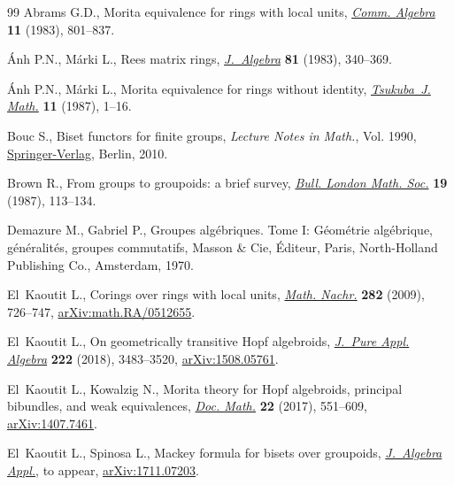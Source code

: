 \documentclass[11pt]{article}
\numberwithin{equation}{section}
\begin{document}
\begin{thebibliography}{99}
Abrams G.D., Morita equivalence for rings with local units, \href{https://doi.org/10.1080/00927878308822881}{\textit{Comm. Algebra}} \textbf{11} (1983), 801--837.

\'{A}nh P.N., M\'{a}rki L., Rees matrix rings, \href{https://doi.org/10.1016/0021-8693(83)90193-X}{\textit{J.~Algebra}} \textbf{81} (1983), 340--369.

\'{A}nh P.N., M\'{a}rki L., Morita equivalence for rings without identity,
 \href{https://doi.org/10.21099/tkbjm/1496160500}{\textit{Tsukuba~J. Math.}} \textbf{11} (1987), 1--16.

Bouc S., Biset functors for finite groups, \textit{Lecture Notes in Math.},
 Vol. 1990, \href{https://doi.org/10.1007/978-3-642-11297-3}{Springer-Verlag}, Berlin, 2010.

Brown R., From groups to groupoids: a brief survey, \href{https://doi.org/10.1112/blms/19.2.113}{\textit{Bull. London Math.
 Soc.}} \textbf{19} (1987), 113--134.

Demazure M., Gabriel P., Groupes alg\'{e}briques. {T}ome {I}:
 {G}\'{e}om\'{e}trie alg\'{e}brique, g\'{e}n\'{e}ralit\'{e}s, groupes
 commutatifs, Masson \& Cie, \'{E}diteur, Paris, North-Holland Publishing Co., Amsterdam, 1970.

El~Kaoutit L., Corings over rings with local units, \href{https://doi.org/10.1002/mana.200610767}{\textit{Math. Nachr.}}
 \textbf{282} (2009), 726--747, \href{https://arxiv.org/abs/math.RA/0512655}{arXiv:math.RA/0512655}.

El~Kaoutit L., On geometrically transitive {H}opf algebroids, \href{https://doi.org/10.1016/j.jpaa.2017.12.019}{\textit{J.~Pure
 Appl. Algebra}} \textbf{222} (2018), 3483--3520, \href{https://arxiv.org/abs/1508.05761}{arXiv:1508.05761}.

El~Kaoutit L., Kowalzig N., Morita theory for {H}opf algebroids, principal
 bibundles, and weak equivalences, \href{https://doi.org/10.25537/dm.2017v22.551-609}{\textit{Doc. Math.}} \textbf{22} (2017),
 551--609, \href{https://arxiv.org/abs/1407.7461}{arXiv:1407.7461}.

El~Kaoutit L., Spinosa L., Mackey formula for bisets over groupoids,
 \href{https://doi.org/10.1142/S0219498819501093}{\textit{J.~Algebra Appl.}}, {t}o appear, \href{https://arxiv.org/abs/1711.07203}{arXiv:1711.07203}.


\end{thebibliography}
\end{document}
